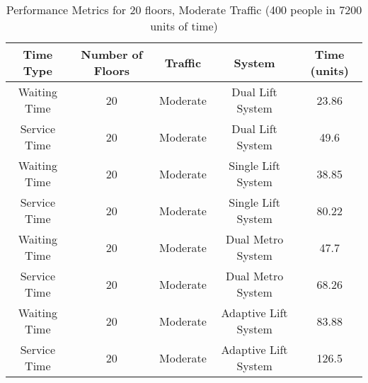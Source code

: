 \documentclass[12pt,a4paper]{report}
\begin{document}
\begin{table}[H]
\centering
\begin{tabular}{|c|c|c|c|c|}
\hline
\textbf{Time Type}    & \textbf{Number of Floors} & \textbf{Traffic} & \textbf{System}     & \textbf{Time (units)} \\ \hline
Waiting Time         & 20                    & Moderate         & Dual Lift System               & 23.86              \\ \hline
Service Time         & 20                    & Moderate         & Dual Lift System               & 49.6               \\ \hline
Waiting Time         & 20                    & Moderate         & Single Lift System             & 38.85              \\ \hline
Service Time         & 20                    & Moderate         & Single Lift System  & 80.22              \\ \hline
Waiting Time         & 20                    & Moderate         & Dual Metro System  & 47.7               \\ \hline
Service Time         & 20                    & Moderate         & Dual Metro System  & 68.26              \\ \hline
Waiting Time         & 20                     & Moderate         & Adaptive Lift System           & 83.88            \\ \hline
Service Time         & 20                     & Moderate         & Adaptive Lift System           & 126.5            \\ \hline
\end{tabular}
\caption{Performance Metrics for 20 floors, Moderate Traffic (400 people in 7200 units of time)}
\end{table}
\end{document}
